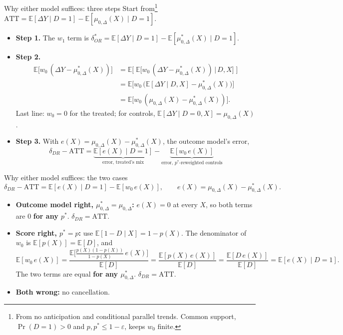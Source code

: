 \documentclass[
  11pt,
  ignorenonframetext,
  aspectratio=169,
]{beamer}
\providecommand{\tightlist}{%
  \setlength{\itemsep}{0pt}\setlength{\parskip}{0pt}}
\begin{document}
\begin{frame}{Why either model suffices: three steps}
\protect{}\label{why-either-model-suffices-three-steps}
Start
from\footnote{From no anticipation and conditional parallel trends. Common support, $\Pr(D=1) > 0$ and $p, p^* \le 1 - \varepsilon$, keeps $w_0$ finite.}
\(\text{ATT} = \mathbb{E}[\Delta Y \mid D=1] - \mathbb{E}[\mu_{0,\Delta}(X) \mid D=1]\).

\begin{itemize}
\tightlist
\item
  \textbf{Step 1.} The \(w_1\) term is
  \(\delta^*_{OR} = \mathbb{E}[\Delta Y \mid D=1] - \mathbb{E}[\mu^*_{0,\Delta}(X) \mid D=1]\).
\item
  \textbf{Step 2.} \[
  \begin{aligned}
  \mathbb{E}\big[w_0\,(\Delta Y - \mu^*_{0,\Delta}(X))\big] &= \mathbb{E}\Big[\;\mathbb{E}\big[w_0\,(\Delta Y - \mu^*_{0,\Delta}(X)) \,\big|\, D, X\big]\;\Big] \\
  &= \mathbb{E}\big[w_0\,\big(\mathbb{E}[\Delta Y \mid D, X] - \mu^*_{0,\Delta}(X)\big)\big] \\
  &= \mathbb{E}\big[w_0\,(\mu_{0,\Delta}(X) - \mu^*_{0,\Delta}(X))\big].
  \end{aligned}
  \] Last line: \(w_0 = 0\) for the treated; for controls,
  \(\mathbb{E}[\Delta Y \mid D=0, X] = \mu_{0,\Delta}(X)\).
\item
  \textbf{Step 3.} With
  \(e(X) = \mu_{0,\Delta}(X) - \mu^*_{0,\Delta}(X)\), the outcome
  model's error, \[
  \delta_{DR} - \text{ATT} = \underbrace{\mathbb{E}[e(X) \mid D=1]}_{\text{error, treated's mix}} - \underbrace{\mathbb{E}[w_0\, e(X)]}_{\text{error, }p^*\text{-reweighted controls}}
  \]
\end{itemize}
\end{frame}

\begin{frame}{Why either model suffices: the two cases}
\protect{}\label{why-either-model-suffices-the-two-cases}
\[
\delta_{DR} - \text{ATT} = \mathbb{E}[e(X) \mid D=1] - \mathbb{E}[w_0\, e(X)], \qquad e(X) = \mu_{0,\Delta}(X) - \mu^*_{0,\Delta}(X).
\]

\begin{itemize}
\tightlist
\item
  \textbf{Outcome model right, \(\mu^*_{0,\Delta} = \mu_{0,\Delta}\):}
  \(e(X) = 0\) at every \(X\), so both terms are \(0\) \textbf{for any
  \(p^*\)}. \(\delta_{DR} = \text{ATT}\).
\item
  \textbf{Score right, \(p^* = p\):} use
  \(\mathbb{E}[1 - D \mid X] = 1 - p(X)\). The denominator of \(w_0\) is
  \(\mathbb{E}[p(X)] = \mathbb{E}[D]\), and \[
  \mathbb{E}[w_0\, e(X)] = \frac{\mathbb{E}\big[\frac{p(X)(1-p(X))}{1-p(X)}\, e(X)\big]}{\mathbb{E}[D]} = \frac{\mathbb{E}[p(X)\, e(X)]}{\mathbb{E}[D]} = \frac{\mathbb{E}[D\, e(X)]}{\mathbb{E}[D]} = \mathbb{E}[e(X) \mid D=1].
  \] The two terms are equal \textbf{for any \(\mu^*_{0,\Delta}\)}.
  \(\delta_{DR} = \text{ATT}\).
\item
  \textbf{Both wrong:} no cancellation.
\end{itemize}
\end{frame}
\end{document}
